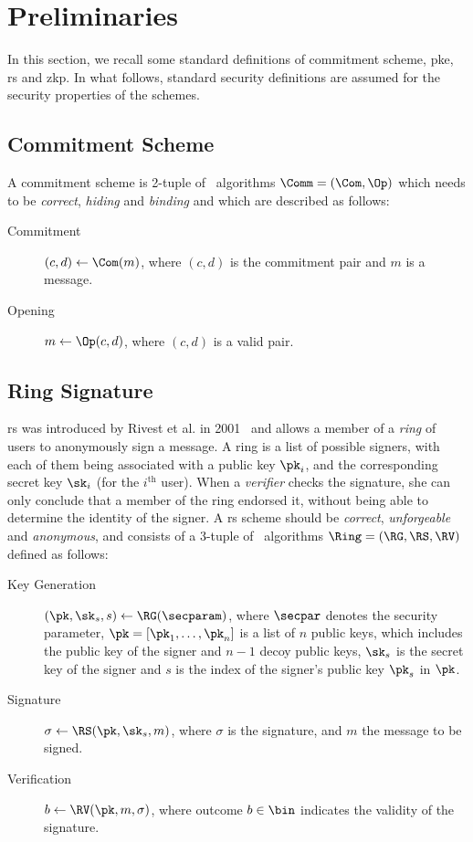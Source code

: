 \section{Preliminaries}
\label{sec-Preliminaries}
In this section, we recall some standard definitions of commitment
scheme, \gls{pke}, \gls{rs} and \gls{zkp}. In what follows, standard security definitions are assumed for the security properties of the schemes.

\subsection{Commitment Scheme}
A commitment scheme is 2-tuple of \ppt ~algorithms $\Comm=(\Com, \Op)$ which needs to be \textit{correct}, \textit{hiding} and \textit{binding} and which are described as follows:
\begin{description}
	\item[Commitment]$(c,d) \gets \Com(m)$, where $(c,d)$ is the commitment pair and $m$ is a message.
	\item[Opening]$m \gets \Op(c,d)$, where $(c,d)$ is a valid pair.
\end{description}

\subsection{Ring Signature}%
\acrlong{rs} was introduced by Rivest et al. in 2001~\cite{rivest2001leak} and allows a member of a \textit{ring} of users to anonymously sign a message. A ring is a list of possible signers, with each of them being associated with a public key $\pk_i$, and the corresponding secret key $\sk_i$ (for the $i^{\text{th}}$ user). When a \textit{verifier} checks the signature, she can only conclude that a member of the ring endorsed it, without being able to determine the identity of the signer. A \gls{rs} scheme should be \textit{correct}, \textit{unforgeable} and \textit{anonymous}, and consists of a 3-tuple of \ppt ~algorithms $\Ring=(\RG, \RS, \RV)$ defined as follows:
\begin{description}
	\item[Key Generation]
	$(\pk,\sk_s,s) \gets \RG(\secparam)$, where $\secpar$ denotes the security parameter, $\pk=[\pk_1, \dots, \pk_n]$ is a list of $n$ public keys, which includes the public key of the signer and $n-1$ decoy public keys, $\sk_s$ is the secret key of the signer and $s$ is the index of the signer's public key $\pk_s$ in $\pk$.
	\item[Signature]
	$\sigma \gets \RS(\pk,\sk_s,m)$, where $\sigma$ is the signature, and $m$ the message to be signed.
\item[Verification]
	$b \gets \RV(\pk,m,\sigma)$, where outcome $b\in\bin$ indicates the validity of the signature.
\end{description}

